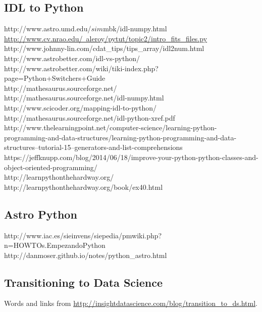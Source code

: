 \documentclass[11pt,a4paper]{article}
\begin{document}
\subsection*{IDL to Python}
http://www.astro.umd.edu/$sim$mbk/idl-numpy.html\\
\href{http://www.cv.nrao.edu/~aleroy/pytut/topic2/intro\_fits\_files.py}{http://www.cv.nrao.edu/~aleroy/pytut/topic2/intro\_fits\_files.py}
http://www.johnny-lin.com/cdat\_tips/tips\_array/idl2num.html\\
http://www.astrobetter.com/idl-vs-python/ \\
http://www.astrobetter.com/wiki/tiki-index.php?page=Python+Switchers+Guide \\
http://mathesaurus.sourceforge.net/\\
http://mathesaurus.sourceforge.net/idl-numpy.html\\
http://www.scicoder.org/mapping-idl-to-python/\\
http://mathesaurus.sourceforge.net/idl-python-xref.pdf\\

\noindent
http://www.thelearningpoint.net/computer-science/learning-python-programming-and-data-structures/learning-python-programming-and-data-structures--tutorial-15--generators-and-list-comprehensions\\
https://jeffknupp.com/blog/2014/06/18/improve-your-python-python-classes-and-object-oriented-programming/\\
http://learnpythonthehardway.org/\\
http://learnpythonthehardway.org/book/ex40.html\\


\subsection*{Astro Python}
http://www.iac.es/sieinvens/siepedia/pmwiki.php?n=HOWTOs.EmpezandoPython \\
http://danmoser.github.io/notes/python\_astro.html \\


\subsection*{Transitioning to Data Science}
\noindent
Words and links from \href{http://insightdatascience.com/blog/transition\_to\_ds.html}{http://insightdatascience.com/blog/transition\_to\_ds.html}. 
\end{document}
